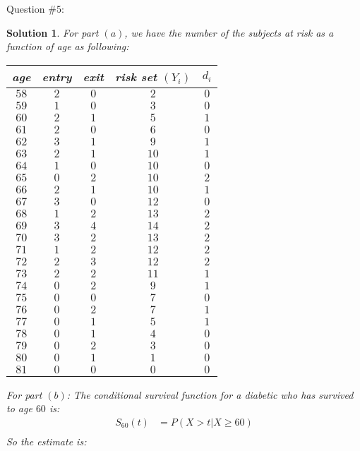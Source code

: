 \documentclass[11pt]{article}
\newtheorem{sol}{Solution}
\begin{document}
Question $\# 5$:
\begin{sol}
	For part $(a)$, we have the number of the subjects at risk as a function of age as following:
	\begin{center}	
		\begin{tabular}{ccccc}
			age & entry & exit & risk set $(Y_i)$ & $d_i$\\
			\hline
			$58$ & $2$ & $0$ & $2$  & $0$\\
			$59$ & $1$ & $0$ & $3$ & $0$\\
			$60$ & $2$ & $1$ & $5$ & $1$\\
			$61$ & $2$ & $0$ & $6$ & $0$\\
			$62$ & $3$ & $1$ & $9$ & $1$\\
			$63$ & $2$ & $1$ & $10$ & $1$\\
			$64$ & $1$ & $0$ & $10$ & $0$\\
			$65$ & $0$ & $2$ & $10$ & $2$\\
			$66$ & $2$ & $1$ & $10$ & $1$\\
			$67$ & $3$ & $0$ & $12$ & $0$\\
			$68$ & $1$ & $2$ & $13$ & $2$\\
			$69$ & $3$ & $4$ & $14$ & $2$\\
			$70$ & $3$ & $2$ & $13$ & $2$\\
			$71$ & $1$ & $2$ & $12$ & $2$\\
			$72$ & $2$ & $3$ & $12$ & $2$\\
			$73$ & $2$ & $2$ & $11$ & $1$\\
			$74$ & $0$ & $2$ & $9$ & $1$\\
			$75$ & $0$ & $0$ & $7$ & $0$\\
			$76$ & $0$ & $2$ & $7$ & $1$\\
			$77$ & $0$ & $1$ & $5$ & $1$\\
			$78$ & $0$ & $1$ & $4$ & $0$\\
			$79$ & $0$ & $2$ & $3$ & $0$\\
			$80$ & $0$ & $1$ & $1$ & $0$\\
			$81$ & $0$ & $0$ & $0$ & $0$\\
		\end{tabular}
	\end{center}
	For part $(b)$:\vskip 2mm
	The conditional survival function for a diabetic who has survived to age $60$ is:
	\begin{align*}
		S_{60}(t)&= P(X > t|X \geq 60)\\
	\end{align*}
	So the estimate is:

\end{sol}
\end{document}

